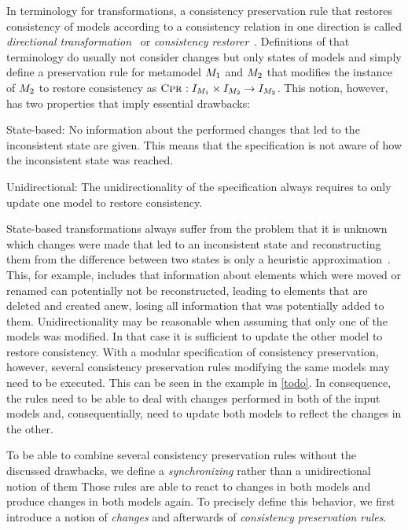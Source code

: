 In terminology for transformations, a \gls{consistency preservation rule} that restores consistency of models according to a \gls{consistency relation} in one direction is called \emph{directional transformation}~\cite{stevens2010sosym} or \emph{consistency restorer}~\cite{stevens2020BidirectionalTransformationLarge-SoSym}.
Definitions of that terminology do usually not consider changes but only states of models and simply define a preservation rule for metamodel $M_{1}$ and $M_{2}$ that modifies the instance of $M_{2}$ to restore consistency as $\textsc{Cpr}_{}: I_{M_{1}} \times I_{M_{2}} \rightarrow I_{M_{2}}$.
This notion, however, has two properties that imply essential drawbacks:
\begin{properdescription}
    \item[State-based:] No information about the performed changes that led to the inconsistent state are given. This means that the specification is not aware of how the inconsistent state was reached.
    \item[Unidirectional:] The unidirectionality of the specification always requires to only update one model to restore consistency.
\end{properdescription}
State-based transformations always suffer from the problem that it is unknown which changes were made that led to an inconsistent state and reconstructing them from the difference between two states is only a heuristic approximation~\cite{diskin2011StateToDeltaSymmetric-MODEDLS}.
This, for example, includes that information about elements which were moved or renamed can potentially not be reconstructed, leading to elements that are deleted and created anew, losing all information that was potentially added to them.
Unidirectionality may be reasonable when assuming that only one of the models was modified. In that case it is sufficient to update the other model to restore consistency.
With a modular specification of consistency preservation, however, several \glspl{consistency preservation rule} modifying the same models may need to be executed.
This can be seen in the example in \autoref{todo}.
In consequence, the rules need to be able to deal with changes performed in both of the input models and, consequentially, need to update both models to reflect the changes in the other.

To be able to combine several \glspl{consistency preservation rule} without the discussed drawbacks, we define a \emph{synchronizing} rather than a unidirectional notion of them
Those rules are able to react to changes in both models and produce changes in both models again.
To precisely define this behavior, we first introduce a notion of \emph{changes} and afterwards of \emph{\glspl{consistency preservation rule}}.


